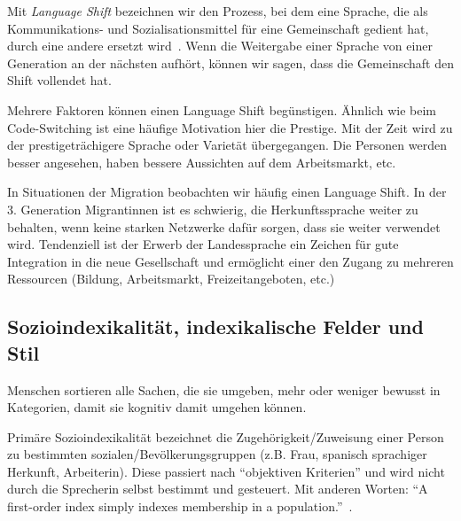 
Mit \textit{Language Shift} bezeichnen wir den Prozess, bei dem eine Sprache, die als Kommunikations- und Sozialisationsmittel für eine Gemeinschaft gedient hat, durch eine andere ersetzt wird~\cite{Potowski13}. %
Wenn die Weitergabe einer Sprache von einer Generation an der nächsten aufhört, können wir sagen, dass die Gemeinschaft den Shift vollendet hat.

Mehrere Faktoren können einen Language Shift begünstigen.
Ähnlich wie beim Code-Switching ist eine häufige Motivation hier die Prestige. %
Mit der Zeit wird zu der prestigeträchigere Sprache oder Varietät übergegangen.
Die Personen werden besser angesehen, haben bessere Aussichten auf dem Arbeitsmarkt, etc.

In Situationen der Migration beobachten wir häufig einen Language Shift.
In der 3. Generation Migrantinnen ist es schwierig, die Herkunftssprache weiter zu behalten, wenn keine starken Netzwerke dafür sorgen, dass sie weiter verwendet wird.
Tendenziell ist der Erwerb der Landessprache ein Zeichen für gute Integration in die neue Gesellschaft und ermöglicht einer den Zugang zu mehreren Ressourcen (Bildung, Arbeitsmarkt, Freizeitangeboten, etc.)

\subsection{Sozioindexikalität, indexikalische Felder und Stil}

Menschen sortieren alle Sachen, die sie umgeben, mehr oder weniger bewusst in Kategorien, damit sie kognitiv damit umgehen können.

Primäre Sozioindexikalität bezeichnet die Zugehörigkeit/Zuweisung einer Person zu bestimmten sozialen/Bevölkerungsgruppen (z.B. Frau, spanisch sprachiger Herkunft, Arbeiterin). %
Diese passiert nach ``objektiven Kriterien'' und wird nicht durch die Sprecherin selbst bestimmt und gesteuert.
Mit anderen Worten: ``A first-order index simply indexes membership in a population.''~\cite{Eckert08}.%

